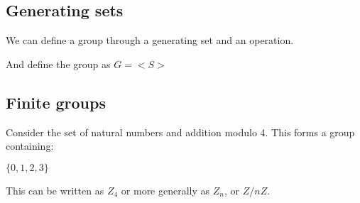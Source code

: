 
\subsection{Generating sets}

We can define a group through a generating set and an operation.

And define the group as \(G=< S >\)

\subsection{Finite groups}

Consider the set of natural numbers and addition modulo 4. This forms a group containing:

\(\{0,1,2,3\}\)

This can be written as \(Z_4\) or more generally as \(Z_n\), or \(Z/nZ\).

